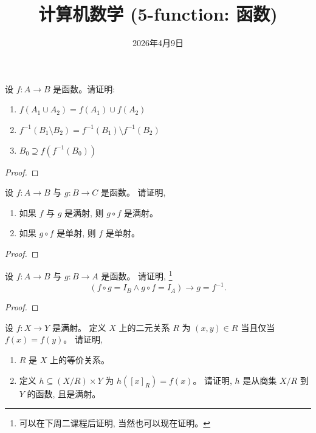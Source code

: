 \documentclass[a4paper, justified]{tufte-handout}
\title{计算机数学 (5-function: 函数)}
\date{2026年4月9日}
\begin{document}
\maketitle
\noplagiarism %
\beginrequired

\begin{problem}[$f$ 与 $f^{-1}$]
  设 $f: A \to B$ 是函数。请证明:
  \begin{enumerate}[(1)]
    \item $f(A_1 \cup A_2) = f(A_1) \cup f(A_2)$
    \item $f^{-1}(B_1 \setminus B_2) = f^{-1}(B_1) \setminus f^{-1}(B_2)$
    \item $B_0 \supseteq f(f^{-1}(B_0))$
  \end{enumerate}
\end{problem}

\begin{proof}
\end{proof}

\begin{problem}[$g \circ f$]
  设 $f: A \to B$ 与 $g: B \to C$ 是函数。
  请证明,
  \begin{enumerate}[(1)]
    \item 如果 $f$ 与 $g$ 是满射, 则 $g \circ f$ 是满射。
    \item 如果 $g \circ f$ 是单射, 则 $f$ 是单射。
  \end{enumerate}
\end{problem}

\begin{proof}
\end{proof}

\begin{problem}[反函数]
  设 $f: A \to B$ 与 $g: B \to A$ 是函数。
  请证明, \footnote{可以在下周二课程后证明, 当然也可以现在证明。}
  \[
    (f \circ g = I_B \land g \circ f = I_A) \to g = f^{-1}.
  \]
\end{problem}

\begin{proof}
\end{proof}

\begin{problem}[函数与等价关系]
  设 $f: X \to Y$ 是满射。
  定义 $X$ 上的二元关系 $R$ 为 $(x, y) \in R$ 当且仅当 $f(x) = f(y)$。
  请证明,
  \begin{enumerate}[(1)]
    \item $R$ 是 $X$ 上的等价关系。
    \item 定义 $h \subseteq (X/R) \times Y$ 为 $h([x]_{R}) = f(x)$。
      请证明, $h$ 是从商集 $X/R$ 到 $Y$ 的函数, 且是满射。
  \end{enumerate}
\end{problem}
\end{document}
